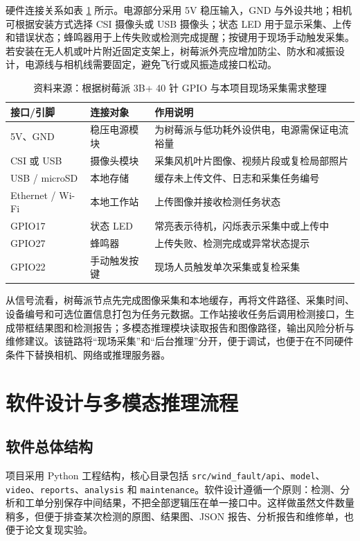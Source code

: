 \documentclass[UTF8,zihao=-4,a4paper]{ctexrep}
\newcommand{\code}[1]{\texttt{#1}}
\newcommand{\tablesource}[1]{\vspace{-0.4em}\caption*{\footnotesize 资料来源：#1}}
\begin{document}
硬件连接关系如表 \ref{tab:hardware_io} 所示。电源部分采用 5V 稳压输入，GND 与外设共地；相机可根据安装方式选择 CSI 摄像头或 USB 摄像头；状态 LED 用于显示采集、上传和错误状态；蜂鸣器用于上传失败或检测完成提醒；按键用于现场手动触发采集。若安装在无人机或叶片附近固定支架上，树莓派外壳应增加防尘、防水和减振设计，电源线与相机线需要固定，避免飞行或风振造成接口松动。

\begin{table}[H]
  \centering
  \caption{树莓派 3B+ 主要硬件接口分配}
  \label{tab:hardware_io}
  \small
  \begin{tabularx}{\textwidth}{l l X}
    \toprule
    接口/引脚 & 连接对象 & 作用说明 \\
    \midrule
    5V、GND & 稳压电源模块 & 为树莓派与低功耗外设供电，电源需保证电流裕量 \\
    CSI 或 USB & 摄像头模块 & 采集风机叶片图像、视频片段或复检局部照片 \\
    USB / microSD & 本地存储 & 缓存未上传文件、日志和采集任务编号 \\
    Ethernet / Wi-Fi & 本地工作站 & 上传图像并接收检测任务状态 \\
    GPIO17 & 状态 LED & 常亮表示待机，闪烁表示采集中或上传中 \\
    GPIO27 & 蜂鸣器 & 上传失败、检测完成或异常状态提示 \\
    GPIO22 & 手动触发按键 & 现场人员触发单次采集或复检采集 \\
    \bottomrule
  \end{tabularx}
  \tablesource{根据树莓派 3B+ 40 针 GPIO 与本项目现场采集需求整理}
\end{table}

从信号流看，树莓派节点先完成图像采集和本地缓存，再将文件路径、采集时间、设备编号和可选位置信息打包为任务元数据。工作站接收任务后调用检测接口，生成带框结果图和检测报告；多模态推理模块读取报告和图像路径，输出风险分析与维修建议。该链路将“现场采集”和“后台推理”分开，便于调试，也便于在不同硬件条件下替换相机、网络或推理服务器。

\chapter{软件设计与多模态推理流程}

\section{软件总体结构}
项目采用 Python 工程结构，核心目录包括 \code{src/wind\_fault/api}、\code{model}、\code{video}、\code{reports}、\code{analysis} 和 \code{maintenance}。软件设计遵循一个原则：检测、分析和工单分别保存中间结果，不把全部逻辑压在单一接口中。这样做虽然文件数量稍多，但便于排查某次检测的原图、结果图、JSON 报告、分析报告和维修单，也便于论文复现实验。
\end{document}
